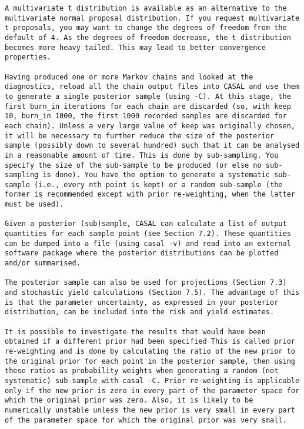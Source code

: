 \CA
\begin{lstlisting}
A multivariate t distribution is available as an alternative to the multivariate normal proposal distribution. If you request multivariate t proposals, you may want to change the degrees of freedom from the default of 4. As the degrees of freedom decrease, the t distribution becomes more heavy tailed. This may lead to better convergence properties.

Having produced one or more Markov chains and looked at the diagnostics, reload all the chain output files into CASAL and use them to generate a single posterior sample (using -C). At this stage, the first burn_in iterations for each chain are discarded (so, with keep 10, burn_in 1000, the first 1000 recorded samples are discarded for each chain). Unless a very large value of keep was originally chosen, it will be necessary to further reduce the size of the posterior sample (possibly down to several hundred) such that it can be analysed in a reasonable amount of time. This is done by sub-sampling. You specify the size of the sub-sample to be produced (or else no sub-sampling is done). You have the option to generate a systematic sub-sample (i.e., every nth point is kept) or a random sub-sample (the former is recommended except with prior re-weighting, when the latter must be used).

Given a posterior (sub)sample, CASAL can calculate a list of output quantities for each sample point (see Section 7.2). These quantities can be dumped into a file (using casal -v) and read into an external software package where the posterior distributions can be plotted and/or summarised. 

The posterior sample can also be used for projections (Section 7.3) and stochastic yield calculations (Section 7.5). The advantage of this is that the parameter uncertainty, as expressed in your posterior distribution, can be included into the risk and yield estimates.

It is possible to investigate the results that would have been obtained if a different prior had been specified This is called prior re-weighting and is done by calculating the ratio of the new prior to the original prior for each point in the posterior sample, then using these ratios as probability weights when generating a random (not systematic) sub-sample with casal -C. Prior re-weighting is applicable only if the new prior is zero in every part of the parameter space for which the original prior was zero. Also, it is likely to be numerically unstable unless the new prior is very small in every part of the parameter space for which the original prior was very small.
\end{lstlisting}




